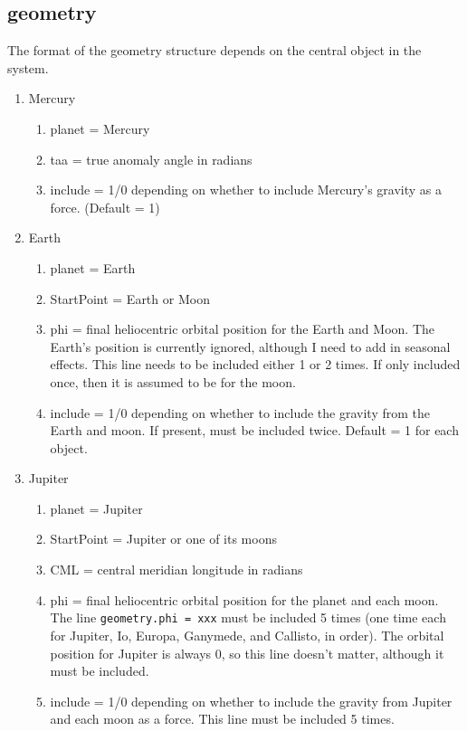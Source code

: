 \documentclass[11pt]{article}
\begin{document}
\subsection{geometry}

The format of the geometry structure depends on the central object in the 
system. 

\begin{enumerate}
\item Mercury
  \begin{enumerate}
  \item planet = Mercury
  \item taa = true anomaly angle in radians
  \item {\color{red}include} = 1/0 depending on whether to include Mercury's 
  gravity as a force. (Default = 1)
  \end{enumerate}
\item Earth
  \begin{enumerate}
  \item planet = Earth
  \item StartPoint = Earth or Moon
  \item phi = final heliocentric orbital position for the Earth and Moon. The Earth's
  position is currently ignored, although I need to add in seasonal effects. This line
  needs to be included either 1 or 2 times. If only included once, then it is assumed to
  be for the moon.
  \item {\color{red}include} = 1/0 depending on whether to include the gravity from the
  Earth and moon. If present, must be included twice. Default = 1 for each object. 
  \end{enumerate}
\item Jupiter
  \begin{enumerate}
  \item planet = Jupiter
  \item StartPoint = Jupiter or one of its moons
  \item CML = central meridian longitude in radians
  \item phi = final heliocentric orbital position for the planet and each moon. 
  The line \texttt{geometry.phi = xxx} must be included 5 times (one time each 
  for Jupiter, Io, Europa, Ganymede, and Callisto, in order). The orbital 
  position for Jupiter is always 0, so this line doesn't matter, although it 
  must be included. 
  \item {\color{red}include} = 1/0 depending on whether to include the gravity 
  from Jupiter and each moon as a force. This line must be included 5 times. 

\end{enumerate}
\end{enumerate}
\end{document}
